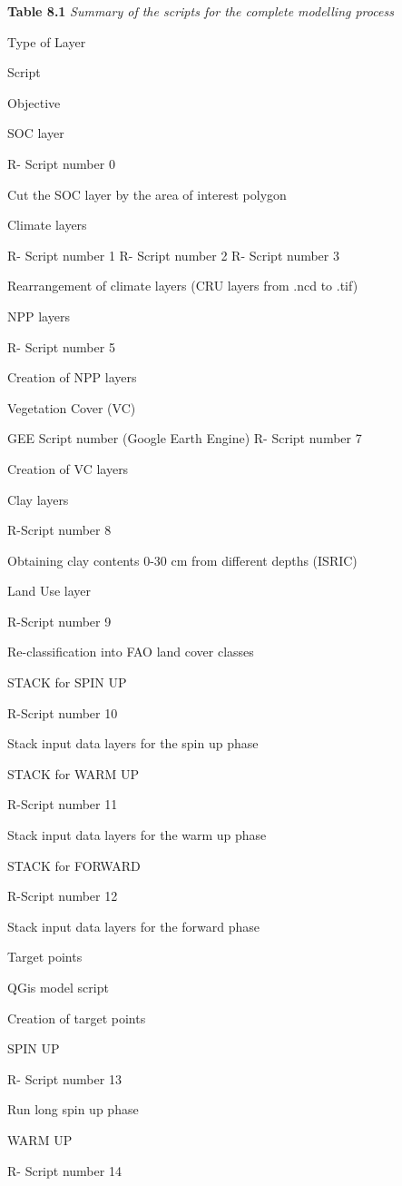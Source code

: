 \documentclass[
  10pt,
  b5paper,
]{book}
\begin{document}
\textbf{Table 8.1} \emph{Summary of the scripts for the complete modelling process}

Type of Layer

Script

Objective

SOC layer

R- Script number 0

Cut the SOC layer by the area of interest polygon

Climate layers

R- Script number 1
R- Script number 2
R- Script number 3

Rearrangement of climate layers (CRU layers from .ncd to .tif)

NPP layers

R- Script number 5

Creation of NPP layers

Vegetation Cover (VC)

GEE Script number (Google Earth Engine)
R- Script number 7

Creation of VC layers

Clay layers

R-Script number 8

Obtaining clay contents 0-30 cm from different depths (ISRIC)

Land Use layer

R-Script number 9

Re-classification into FAO land cover classes

STACK for SPIN UP

R-Script number 10

Stack input data layers for the spin up phase

STACK for WARM UP

R-Script number 11

Stack input data layers for the warm up phase

STACK for FORWARD

R-Script number 12

Stack input data layers for the forward phase

Target points

QGis model script

Creation of target points

SPIN UP

R- Script number 13

Run long spin up phase

WARM UP

R- Script number 14
\end{document}

